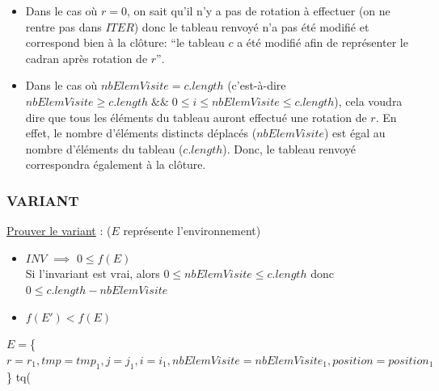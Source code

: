 	\begin{itemize}
		\item Dans le cas où $r=0$, on sait qu’il n’y a pas de rotation à effectuer (on ne rentre pas dans $ITER$) donc le tableau renvoyé n’a pas été modifié et correspond bien à la clôture: “le tableau $c$ a été modifié afin de représenter le cadran après rotation de $r”$.
		\item Dans le cas où $nbElemVisite = c.length$ (c’est-à-dire $nbElemVisite \geq c.length \;\&\&\; 0 \leq i \leq nbElemVisite \leq c.length$), cela voudra dire que tous les éléments du tableau auront effectué une rotation de $r$. En effet, le nombre d’éléments distincts déplacés ($nbElemVisite$) est égal au nombre d’éléments du tableau ($c.length$). Donc, le tableau renvoyé correspondra également à la clôture.
	\end{itemize}


	\subsubsection{VARIANT}	

	\begin{description}
		\item \underline{Prouver le variant} : ($E$ représente l’environnement)	
		\begin{itemize}	
			\item $INV$ $\implies$ $0 \leq f(E)$\\
			Si l’invariant est vrai, alors $0 \leq nbElemVisite \leq c.length$ 
			donc $0 \leq c.length - nbElemVisite$
			\item $f(E') <f(E)$
		\end{itemize}
	\end{description}	


	\begin{description}
		\item[$E = $\{$r=r_1, tmp=tmp_1,  j=j_1, i=i_1, nbElemVisite=nbElemVisite_1, position=position_1$\} tq(] 
	\end{description}	

